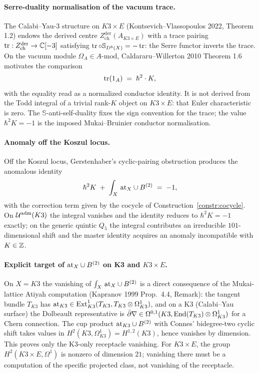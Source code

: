 \paragraph{Serre-duality normalisation of the vacuum trace.}
The Calabi--Yau-$3$ structure on $K3 \times E$ (Kontsevich--Vlassopoulos
2022, Theorem 1.2) endows the derived centre $Z^{\mathrm{der}}_{\mathrm{ch}}(A_{K3\times E})$
with a trace pairing $\operatorname{tr} : Z^{\mathrm{der}}_{\mathrm{ch}} \to \mathbb{C}[-3]$
satisfying $\operatorname{tr} \circ \mathbb S_{D^b(X)} = -\operatorname{tr}$: the Serre functor
inverts the trace. On the vacuum module $\Omega_A \in A\text{-mod}$,
Caldararu--Willerton 2010 Theorem 1.6 motivates the comparison
\begin{equation}
\label{eq:voa-trace-vacuum}
  \operatorname{tr}(1_A) \;=\; {\hslash}^2\cdot K,
\end{equation}
with the equality read as a normalized conductor identity. It is not
derived from the Todd integral of a trivial rank-$K$ object on
$K3\times E$: that Euler characteristic is zero. The
$\mathbb S$-anti-self-duality fixes the sign convention for the trace;
the value $\hbar^2K=-1$ is the imposed Mukai--Bruinier conductor
normalisation.

\paragraph{Anomaly off the Koszul locus.}
Off the Koszul locus, Gerstenhaber's cyclic-pairing obstruction
produces the anomalous identity
\begin{equation}
\label{eq:voa-universal-trace-anomaly}
  {\hslash}^2 K \;+\; \int_X\,\mathrm{at}_X\cup B^{(2)} \;=\; -1,
\end{equation}
with the correction term given by the cocycle of
Construction~\ref{constr:cocycle}. On $\mathcal{U}^{\mathrm{adm}}(K3)$ the
integral vanishes and the identity reduces to $\hbar^2 K = -1$
exactly; on the generic quintic $Q_5$ the integral contributes an
irreducible $101$-dimensional shift and the master identity acquires
an anomaly incompatible with $K \in \mathbb{Z}$.

\paragraph{Explicit target of $\mathrm{at}_X \cup B^{(2)}$ on K3 and $K3\times E$.}
On $X = K3$ the vanishing of $\int_X\,\mathrm{at}_X\cup B^{(2)}$ is a
direct consequence of the Mukai-lattice Atiyah computation
(Kapranov 1999 Prop.~4.4, Remark): the tangent bundle $T_{K3}$
has $\mathrm{at}_{K3} \in \operatorname{Ext}^1_{K3}(T_{K3}, T_{K3}\otimes\Omega^1_{K3})$,
and on a K3 (Calabi--Yau surface) the Dolbeault representative is
$\bar\partial\nabla \in \Omega^{0,1}(K3, \operatorname{End}(T_{K3})\otimes\Omega^1_{K3})$
for a Chern connection. The cup product $\mathrm{at}_{K3}\cup B^{(2)}$
with Connes' bidegree-two cyclic shift takes values in
$H^2(K3, \Omega^1_{K3})=H^{1,2}(K3)$, hence vanishes by dimension.
This proves only the K3-only receptacle vanishing. For $K3\times E$,
the group $H^2(K3\times E,\Omega^1)$ is nonzero of dimension $21$;
vanishing there must be a computation of the specific projected class,
not vanishing of the receptacle.

